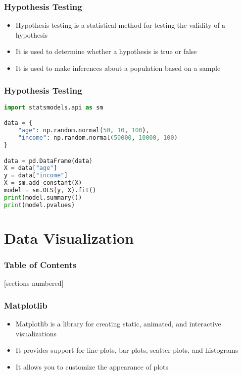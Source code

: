\documentclass[serif, 9pt, aspectratio=32]{beamer}
\begin{document}
\begin{frame}
    \centering
    \frametitle{Hypothesis Testing}
    \begin{itemize}
        \setlength{\itemsep}{2em}
        \item Hypothesis testing is a statistical method for testing the validity of a hypothesis
        \item It is used to determine whether a hypothesis is true or false
        \item It is used to make inferences about a population based on a sample
    \end{itemize}
\end{frame}

\begin{frame}[fragile]
    \frametitle{Hypothesis Testing}
    \begin{lstlisting}[language=Python]
import statsmodels.api as sm

data = {
    "age": np.random.normal(50, 10, 100),
    "income": np.random.normal(50000, 10000, 100)
}

data = pd.DataFrame(data)
X = data["age"]
y = data["income"]
X = sm.add_constant(X)
model = sm.OLS(y, X).fit()
print(model.summary())
print(model.pvalues)
    \end{lstlisting}
\end{frame}

\section{Data Visualization}

\begin{frame}
    \frametitle{Table of Contents}
    [sections numbered]
    \tableofcontents[currentsection]
\end{frame}

\begin{frame}
    \centering
    \frametitle{Matplotlib}
    \begin{itemize}
        \setlength{\itemsep}{2em}
        \item Matplotlib is a library for creating static, animated, and interactive visualizations
        \item It provides support for line plots, bar plots, scatter plots, and histograms
        \item It allows you to customize the appearance of plots
    \end{itemize}
\end{frame}
\end{document}
